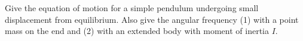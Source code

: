 

\vspace*{\fill}
\centering

Give the equation of motion for a simple pendulum undergoing small displacement from equilibrium. Also give the angular frequency (1) with a point mass on the end and (2) with an extended body with moment of inertia $I$.

\centering
\vspace*{\fill}

